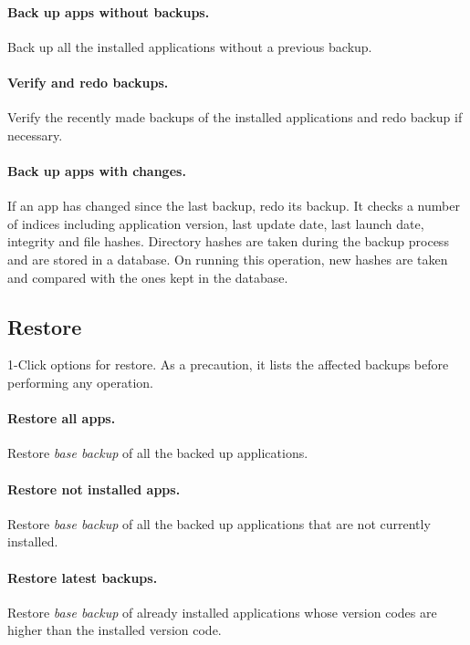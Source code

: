 \paragraph{Back up apps without backups.} Back up all the installed applications without a previous backup.

\paragraph{Verify and redo backups.} Verify the recently made backups of the installed applications and redo backup if necessary.

\paragraph{Back up apps with changes.} If an app has changed since the last backup, redo its backup.
It checks a number of indices including application version, last update date, last launch date, integrity and file hashes.
Directory hashes are taken during the backup process and are stored in a database.
On running this operation, new hashes are taken and compared with the ones kept in the database.

\subsection{Restore}\label{subsec:1-click-restore} %
1-Click options for restore. As a precaution, it lists the affected backups before performing any operation.

\paragraph{Restore all apps.} Restore \textit{base backup} of all the backed up applications.

\paragraph{Restore not installed apps.} Restore \textit{base backup} of all the backed up applications that are not currently installed.

\paragraph{Restore latest backups.} Restore \textit{base backup} of already installed applications whose version codes are higher than the installed version code.
